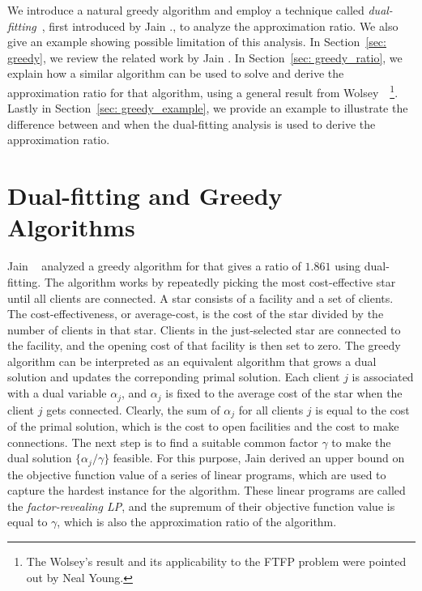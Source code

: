 \documentclass[oneside,final]{ucr}
\begin{document}
We introduce a natural greedy algorithm and employ a
technique called \emph{dual-fitting}~\cite{JainMMSV03},
first introduced by Jain {\etal.}, to analyze the
approximation ratio. We also give an example showing
possible limitation of this analysis.  In Section~\ref{sec:
  greedy}, we review the related work by Jain {\etal}.  In
Section~\ref{sec: greedy_ratio}, we explain how a similar
algorithm can be used to solve {\FTFP} and derive the
approximation ratio for that algorithm, using a general
result from Wolsey~\cite{Wolsey88}~\footnote{The Wolsey's
  result and its applicability to the FTFP problem were
  pointed out by Neal Young.}. Lastly in Section~\ref{sec:
  greedy_example}, we provide an example to illustrate the
difference between {\UFL} and {\FTFP} when the dual-fitting
analysis is used to derive the approximation ratio.

\section{Dual-fitting and Greedy Algorithms}
\label{sec: greedy}

Jain {\etal}~\cite{JainMMSV03} analyzed a greedy algorithm
for {\UFL} that gives a ratio of $1.861$ using
dual-fitting. The algorithm works by repeatedly picking the
most cost-effective star until all clients are connected. A
star consists of a facility and a set of clients. The
cost-effectiveness, or average-cost, is the cost of the star
divided by the number of clients in that star. Clients in
the just-selected star are connected to the facility, and
the opening cost of that facility is then set to zero. The
greedy algorithm can be interpreted as an equivalent
algorithm that grows a dual solution and updates the
correponding primal solution. Each client $j$ is associated
with a dual variable $\alpha_j$, and $\alpha_j$ is fixed to
the average cost of the star when the client $j$ gets
connected. Clearly, the sum of $\alpha_j$ for all clients
$j$ is equal to the cost of the primal solution, which is
the cost to open facilities and the cost to make
connections. The next step is to find a suitable common
factor $\gamma$ to make the dual solution $\{\alpha_j /
\gamma\}$ feasible. For this purpose, Jain {\etal} derived
an upper bound on the objective function value of a series
of linear programs, which are used to capture the hardest
instance for the algorithm. These linear programs are called
the \emph{factor-revealing LP}, and the supremum of their
objective function value is equal to $\gamma$, which is also
the approximation ratio of the algorithm.
\end{document}
